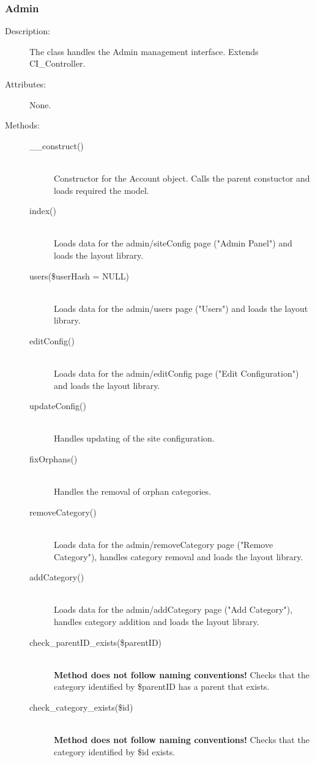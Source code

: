 \documentclass[11pt]{article} %
\begin{document}
\subsubsection{Admin}
\begin{description}
\item[Description:] The class handles the Admin management interface. Extends CI\_Controller.
\item[Attributes:] None.
\item[Methods:] \textbf{ }
\begin{description}
\item[\_\_construct()]  \textbf{ }\\
Constructor for the Account object. Calls the parent constuctor and loads required the model.
\item[index()]  \textbf{ }\\
Loads data for the admin/siteConfig page ("Admin Panel") and loads the layout library.
\item[users(\$userHash = NULL)]  \textbf{ }\\
Loads data for the admin/users page ("Users") and loads the layout library.
\item[editConfig()]  \textbf{ }\\
Loads data for the admin/editConfig page ("Edit Configuration") and loads the layout library.
\item[updateConfig()]  \textbf{ }\\
Handles updating of the site configuration.
\item[fixOrphans()]  \textbf{ }\\
Handles the removal of orphan categories.
\item[removeCategory()]  \textbf{ }\\
Loads data for the admin/removeCategory page ("Remove Category"), handles category removal and loads the layout library.
\item[addCategory()]  \textbf{ }\\
Loads data for the admin/addCategory page ("Add Category"), handles category addition and loads the layout library.
\item[check\_parentID\_exists(\$parentID)]  \textbf{ }\\
\textbf{Method does not follow naming conventions!} Checks that the category identified by \$parentID has a parent that exists.
\item[check\_category\_exists(\$id)]  \textbf{ }\\
\textbf{Method does not follow naming conventions!} Checks that the category identified by \$id exists.
\end{description} 
\end{description} 
\end{document}
